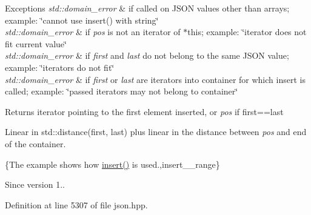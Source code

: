 \begin{DoxyExceptions}{Exceptions}
{\em std\+::domain\+\_\+error} & if called on J\+S\+O\+N values other than arrays; example\+: {\ttfamily \char`\"{}cannot use insert() with string\char`\"{}} \\
\hline
{\em std\+::domain\+\_\+error} & if {\itshape pos} is not an iterator of $\ast$this; example\+: {\ttfamily \char`\"{}iterator does not fit current value\char`\"{}} \\
\hline
{\em std\+::domain\+\_\+error} & if {\itshape first} and {\itshape last} do not belong to the same J\+S\+O\+N value; example\+: {\ttfamily \char`\"{}iterators do not fit\char`\"{}} \\
\hline
{\em std\+::domain\+\_\+error} & if {\itshape first} or {\itshape last} are iterators into container for which insert is called; example\+: {\ttfamily \char`\"{}passed iterators may not
belong to container\char`\"{}}\\
\hline
\end{DoxyExceptions}
\begin{DoxyReturn}{Returns}
iterator pointing to the first element inserted, or {\itshape pos} if {\ttfamily first==last}
\end{DoxyReturn}
Linear in {\ttfamily std\+::distance(first, last)} plus linear in the distance between {\itshape pos} and end of the container.

\{The example shows how {\ttfamily \hyperlink{classnlohmann_1_1basic__json_a7f7bbb3a9efef2e2442f538a24c1c47b}{insert()}} is used.,insert\+\_\+\+\_\+range\}

\begin{DoxySince}{Since}
version 1.. 
\end{DoxySince}


Definition at line 5307 of file json.\+hpp.

\hypertarget{classnlohmann_1_1basic__json_aadb4e5be88221e5e28cdb752332f3d13}{}
